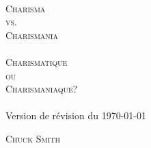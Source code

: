 
\pagestyle{empty}

\makeatletter
\begin{titlepage}
\begin{center}
\mbox{}
\vfill
\HRule \\[0.4cm]
\textsc{ \Huge %
    {Charisma\\ vs.\\[0.4cm] Charismania\\[0.4cm]\HRule\\[0.4cm]}{}
Charismatique\\ ou\\[0.4cm] Charismaniaque?}\\[0.4cm]

\HRule \\[1.5cm]

%
   {\Large Version de r\'evision du \today}{}

\textsc{\Large Chuck Smith}\\[1.5cm]
\vfill
\mbox{}
\end{center}
\end{titlepage}
\makeatother

